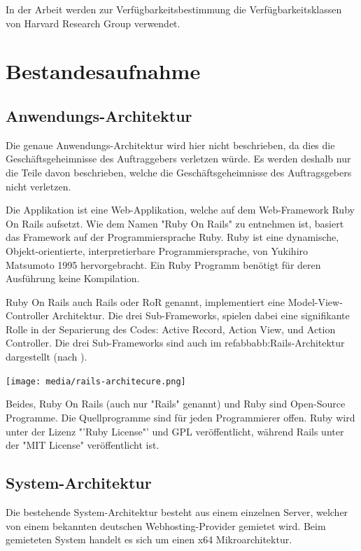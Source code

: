 In der Arbeit werden zur Verfügbarkeitsbestimmung die Verfügbarkeitsklassen von Harvard Research Group verwendet.

\section{Bestandesaufnahme}
\subsection{Anwendungs-Architektur}
Die genaue Anwendungs-Architektur wird hier nicht beschrieben, da dies die Geschäftsgeheimnisse des Auftraggebers verletzen würde. Es werden deshalb nur die Teile davon beschrieben, welche die Geschäftsgeheimnisse des Auftragsgebers nicht verletzen.

Die Applikation ist eine Web-Applikation, welche auf dem Web-Framework Ruby On Rails aufsetzt.
Wie dem Namen "Ruby On Rails" zu entnehmen ist, basiert das Framework auf der Programmiersprache Ruby. Ruby ist eine dynamische, Objekt-orientierte, interpretierbare Programmiersprache, von Yukihiro Matsumoto 1995 hervorgebracht. Ein Ruby Programm benötigt für deren Ausführung keine Kompilation.

Ruby On Rails auch Rails oder RoR genannt, implementiert eine Model-View-Controller Architektur. Die drei Sub-Frameworks, spielen dabei eine signifikante Rolle in der Separierung des Codes: Active Record, Action View, und Action Controller. Die drei Sub-Frameworks sind auch im refabb{abb:Rails-Architektur} dargestellt (nach \cite{Bachle2007}).

\begin{center}
\texttt{[image: media/rails-architecure.png]}
\end{center}

Beides, Ruby On Rails (auch nur "Rails" genannt) und Ruby sind Open-Source Programme. Die Quellprogramme sind für jeden Programmierer offen. Ruby wird unter der Lizenz "'Ruby License"' und GPL veröffentlicht, während Rails unter der "MIT License" veröffentlicht ist.

\subsection{System-Architektur}\label{System-Architektur}
Die bestehende System-Architektur besteht aus einem einzelnen Server, welcher von einem bekannten deutschen Webhosting-Provider gemietet wird. Beim gemieteten System handelt es sich um einen x64 Mikroarchitektur.

